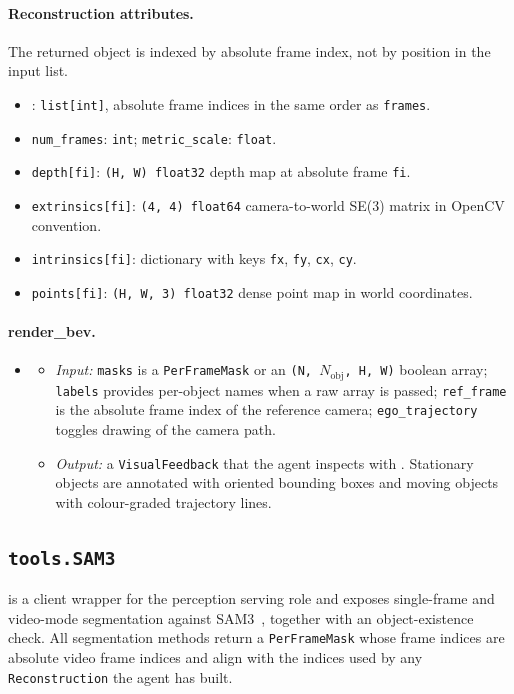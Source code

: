 \paragraph{Reconstruction attributes.} The returned object is indexed by absolute frame index, not by position in the input list.
\begin{itemize}[leftmargin=1.5em]
\item {}: \texttt{list[int]}, absolute frame indices in the same order as \texttt{frames}.
\item \texttt{num\_frames}: \texttt{int}; \texttt{metric\_scale}: \texttt{float}.
\item \texttt{depth[fi]}: \texttt{(H, W) float32} depth map at absolute frame \texttt{fi}.
\item \texttt{extrinsics[fi]}: \texttt{(4, 4) float64} camera-to-world SE(3) matrix in OpenCV convention.
\item \texttt{intrinsics[fi]}: dictionary with keys \texttt{fx}, \texttt{fy}, \texttt{cx}, \texttt{cy}.
\item \texttt{points[fi]}: \texttt{(H, W, 3) float32} dense point map in world coordinates.
\end{itemize}

\paragraph{render\_bev.}
\begin{itemize}[leftmargin=1.5em]
\item {}
  \begin{itemize}
  \item \emph{Input:} \texttt{masks} is a \texttt{PerFrameMask} or an \texttt{(N, $N_{\text{obj}}$, H, W)} boolean array; \texttt{labels} provides per-object names when a raw array is passed; \texttt{ref\_frame} is the absolute frame index of the reference camera; \texttt{ego\_trajectory} toggles drawing of the camera path.
  \item \emph{Output:} a \texttt{VisualFeedback} that the agent inspects with . Stationary objects are annotated with oriented bounding boxes and moving objects with colour-graded trajectory lines.
  \end{itemize}
\end{itemize}

\subsection{\texttt{tools.SAM3}}
\label{app:tool_sam3}
 is a client wrapper for the perception serving role and exposes single-frame and video-mode segmentation against SAM3~\citep{carion2025sam}, together with an object-existence check. All segmentation methods return a \texttt{PerFrameMask} whose frame indices are absolute video frame indices and align with the indices used by any \texttt{Reconstruction} the agent has built.

